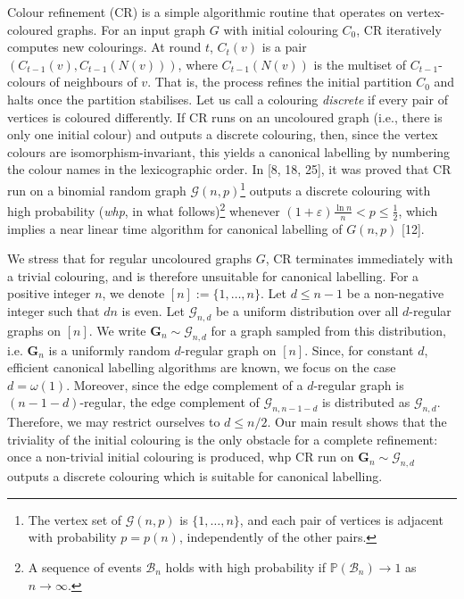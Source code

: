 \documentclass[10pt,a4paper]{article}
\begin{document}
Colour refinement (CR) is a simple algorithmic routine that operates on vertex-coloured graphs. For an input graph
$G$ with initial colouring $C_{0}$, CR iteratively computes new colourings. At round $t$, $C_{t}(v)$ is a pair $(C_{t-1}(v),C_{t-1}(N(v)))$, where $C_{t-1}(N(v))$ is the multiset of $C_{t-1}$-colours of neighbours of $v$. That is, the process refines the initial partition $C_{0}$ and halts once the partition stabilises. Let us call a colouring \emph{discrete} if every pair of vertices is coloured differently. If CR runs on an uncoloured graph (i.e., there is only one initial colour) and outputs a discrete colouring, then, since the vertex colours are isomorphism-invariant, this yields a canonical labelling by numbering the colour names in the lexicographic order. In [8, 18, 25], it was proved that CR run on a binomial random graph $\mathcal{G}(n,p)$\footnote{The vertex set of $\mathcal{G}(n,p)$ is $\{1,\ldots,n\}$, and each pair of vertices is adjacent with probability $p=p(n)$, independently of the other pairs.} outputs a discrete colouring with high probability (\emph{whp}, in what follows)\footnote{A sequence of events $\mathcal{B}_{n}$ holds with high probability if $\mathbb{P}(\mathcal{B}_{n})\to 1$ as $n\to\infty$.} whenever $(1+\varepsilon)\frac{\ln n}{n}<p\leq\frac{1}{2}$, which implies a near linear time algorithm for canonical labelling of $G(n,p)$ [12].\par




We stress that for regular uncoloured graphs $G$, CR terminates immediately with a trivial colouring, and is therefore unsuitable for canonical labelling. For a positive integer $n$, we denote $[n]:=\{1,\ldots,n\}$. Let $d\leq n-1$ be a non-negative integer such that $dn$ is even. Let $\mathcal{G}_{n,d}$ be a uniform distribution over all $d$-regular graphs on $[n]$. We write $\mathbf{G}_{n}\sim\mathcal{G}_{n,d}$ for a graph sampled from this distribution, i.e. $\mathbf{G}_{n}$ is a uniformly random $d$-regular graph on $[n]$. Since, for constant $d$, efficient canonical labelling algorithms are known, we focus on the case $d=\omega(1)$. Moreover, since the edge complement of a $d$-regular graph is $(n-1-d)$-regular, the edge complement of $\mathcal{G}_{n,n-1-d}$ is distributed as $\mathcal{G}_{n,d}$. Therefore, we may restrict ourselves to $d\leq n/2$. Our main result shows that the triviality of the initial colouring is the only obstacle for a complete refinement: once a non-trivial initial colouring is produced, whp CR run on $\mathbf{G}_{n}\sim\mathcal{G}_{n,d}$ outputs a discrete colouring which is suitable for canonical labelling.\par
\end{document}
